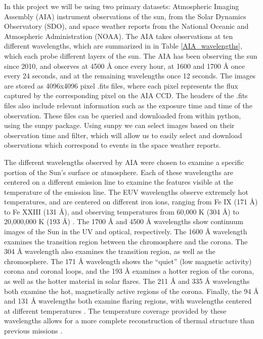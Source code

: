 \documentclass[12pt, letterpaper]{article}
\begin{document}
In this project we will be using two primary datasets: Atmospheric Imaging Assembly (AIA) instrument observations of the sun, from the Solar Dynamics Observatory (SDO), and space weather reports from the National Oceanic and Atmospheric Administration (NOAA).
The AIA takes observations at ten different wavelengths, which are summarized in in Table \ref{AIA_wavelengths}, which each probe different layers of the sun. The AIA has been observing the sun since 2010, and observes at 4500 Å once every hour, at 1600 and 1700 Å once every 24 seconds, and at the remaining wavelengths once 12 seconds. The images are stored as 4096x4096 pixel .fits files, where each pixel represents the flux captured by the corresponding pixel on the AIA CCD. The headers of the .fits files also include relevant information such as the exposure time and time of the observation. These files can be queried and downloaded from within python, using the sunpy package. Using sunpy we can select images based on their observation time and filter, which will allow us to easily select and download observations which correspond to events in the space weather reports. 

The different wavelengths observed by AIA were chosen to examine a specific portion of the Sun’s surface or atmosphere. Each of these wavelengths are centered on a different emission line to examine the features visible at the temperature of the emission line. The EUV wavelengths observe extremely hot temperatures, and are centered on different iron ions, ranging from Fe IX (171 Å) to Fe XXIII (131 Å), and observing temperatures from 60,000 K (304 Å) to 20,000,000 K (193 Å) \cite{Lemen2012}. The 1700 Å and 4500 Å wavelengths show continuum images of the Sun in the UV and optical, respectively. The 1600 Å wavelength examines the transition region between the chromosphere and the corona. The 304 Å wavelength also examines the transition region, as well as the chromosphere. The 171 Å wavelength shows the “quiet” (low magnetic activity) corona and coronal loops, and the 193 Å examines a hotter region of the corona, as well as the hotter material in solar flares. The 211 Å and 335 Å wavelengths both examine the hot, magnetically active regions of the corona. Finally, the 94 Å and 131 Å wavelengths both examine flaring regions, with wavelengths centered at different temperatures \cite{Zell2015}. The temperature coverage provided by these wavelengths allows for a more complete reconstruction of thermal structure than previous missions \cite{AIA_ConceptReport}.
\end{document}
